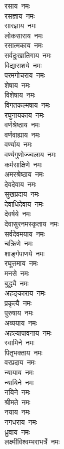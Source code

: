 \begin{multicols}{2}
\begin{flushleft}
रसाय~नमः\\
रसज्ञाय~नमः\\
सारज्ञाय~नमः\\
लोकसाराय~नमः\\
रसात्मकाय~नमः\hfill{}\\
सर्वदुःखातिगाय~नमः\\
विद्याराशये~नमः\\
परमगोचराय~नमः\\
शेषाय~नमः\\
विशेषाय~नमः\\
विगतकल्मषाय~नमः\\
रघुनायकाय~नमः\\
वर्णश्रेष्ठाय~नमः\\
वर्णवाह्याय~नमः\\
वर्ण्याय~नमः\hfill{}\\
वर्ण्यगुणोज्ज्वलाय~नमः\\
कर्मसाक्षिणे~नमः\\
अमरश्रेष्ठाय~नमः\\
देवदेवाय~नमः\\
सुखप्रदाय~नमः\\
देवाधिदेवाय~नमः\\
देवर्षये~नमः\\
देवासुरनमस्कृताय~नमः\\
सर्वदेवमयाय~नमः\\
चक्रिणे~नमः\hfill{}\\
शार्ङ्गपाणये~नमः\\
रघूत्तमाय~नमः\\
मनसे~नमः\\
बुद्ध्यै~नमः\\
अहङ्काराय~नमः\\
प्रकृत्यै~नमः\\
पुरुषाय~नमः\\
अव्ययाय~नमः\\
अहल्यापावनाय~नमः\\
स्वामिने~नमः\hfill{}\\
पितृभक्ताय~नमः\\
वरप्रदाय~नमः\\
न्यायाय~नमः\\
न्यायिने~नमः\\
नयिने~नमः\\
श्रीमते~नमः\\
नयाय~नमः\\
नगधराय~नमः\\
ध्रुवाय~नमः\\
लक्ष्मीविश्वम्भराभर्त्रे~नमः\hfill{}\\

\end{flushleft}
\end{multicols}
